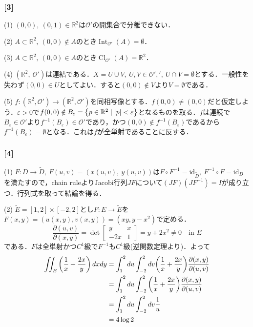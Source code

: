 \documentclass[a4j]{ltjsarticle}
\newcommand{\Rset}{\mathbb{R}}
\newcommand{\1}{\mathbbm{1}}
\DeclareMathOperator*{\interior}{\mathrm{Int}}
\DeclareMathOperator*{\closure}{\mathrm{Cl}}
\numberwithin{equation}{section}
\theoremstyle{definition}
\begin{document}
\subsubsection*{[3]}
(1) $(0,0),\ (0,1)\in\Rset^2$は$\mathcal{O}'$の開集合で分離できない．

(2) $A\subset\Rset^2,\ (0,0)\notin A$のとき$\interior_{\mathcal{O}'}(A)=\emptyset$．

(3) $A\subset \Rset^2,\ (0,0)\in A$のとき$\closure_{\mathcal{O}'}(A)=\Rset^2$．

(4) $(\Rset^2,\ \mathcal{O}')$は連結である．$X=U\cup V,\ U,V\in\mathcal{O}',',\ U\cap V=\emptyset$とする．一般性を失わず$(0,0)\in U$としてよい．すると$(0,0)\notin V$より$V=\emptyset$である．

(5) $f\colon (\Rset^2,\mathcal{O}')\to(\Rset^2,\mathcal{O}')$を同相写像とする．$f(0,0)\neq(0,0)$だと仮定しよう．$\varepsilon>0$で$f(0,0)\notin B_\varepsilon=\qty{p\in \Rset^2\mid \abs{p}<\varepsilon}$となるものを取る．$f$は連続で$B_{\varepsilon}\in\mathcal{O}'$より$f^{-1}(B_{\varepsilon})\in\mathcal{O}'$であり，かつ$(0,0)\notin f^{-1}(B_{\varepsilon})$であるから$f^{-1}(B_{\varepsilon})=\emptyset$となる．これは$f$が全単射であることに反する．

\subsubsection*{[4]}
(1) $F\colon D\to \widetilde{D},\ F(u,v)=(x(u,v),\ y(u,v))$は$F\circ F^{-1}=\mathrm{id}_{\widetilde{D}},\ F^{-1}\circ F=\mathrm{id}_{D}$を満たすので，chain ruleよりJacobi行列$JF$について$(JF)(JF^{-1})=I$が成り立つ．行列式を取って結論を得る．

(2) $\widetilde{E}=[1,2]\times [-2,2]$とし$F\colon E\to \widetilde{E}$を$F(x,y)=(u(x,y),v(x,y))=(xy,y-x^2)$で定める．
\begin{equation}
    \frac{\partial(u,v)}{\partial(x,y)}=\det\begin{bmatrix}
        y & x \\
        -2x & 1 
    \end{bmatrix}=y+2x^2\neq0\quad \text{in $E$}
\end{equation}
である．$F$は全単射かつ$C^1$級で$F^{-1}$も$C^1$級(逆関数定理より)．よって
\begin{align}
    \iint_{E}\qty(\frac{1}{x}+\frac{2x}{y})\,dxdy&=\int_1^2du\int_{-2}^{2}dv\qty(\frac{1}{x}+\frac{2x}{y})\frac{\partial(x,y)}{\partial(u,v)}\\
    &=\int_1^2du\int_{-2}^{2}\qty(\frac{1}{x}+\frac{2x}{y})\frac{\partial(x,y)}{\partial(u,v)}\\
    &=\int_{1}^2du\int_{-2}^2dv\frac{1}{u}\\
    &=4\log2
\end{align}
\end{document}
